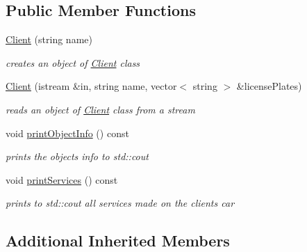 \subsection*{Public Member Functions}
\begin{DoxyCompactItemize}
\item 
\hypertarget{class_client_a62ec00483394e1de13111094b221921d}{}\hyperlink{class_client_a62ec00483394e1de13111094b221921d}{Client} (string name)\label{class_client_a62ec00483394e1de13111094b221921d}

\begin{DoxyCompactList}\small\item\em creates an object of \hyperlink{class_client}{Client} class \end{DoxyCompactList}\item 
\hyperlink{class_client_aae5506d2aa6e4486f8e393b75ff5b5f4}{Client} (istream \&in, string name, vector$<$ string $>$ \&license\+Plates)
\begin{DoxyCompactList}\small\item\em reads an object of \hyperlink{class_client}{Client} class from a stream \end{DoxyCompactList}\item 
\hypertarget{class_client_a774e8af1c055d52dfe8a1db0847332d0}{}void \hyperlink{class_client_a774e8af1c055d52dfe8a1db0847332d0}{print\+Object\+Info} () const \label{class_client_a774e8af1c055d52dfe8a1db0847332d0}

\begin{DoxyCompactList}\small\item\em prints the objects\textquotesingle{} info to std\+::cout \end{DoxyCompactList}\item 
\hypertarget{class_client_aef483ed374ceca699aa17bc90fe82f68}{}void \hyperlink{class_client_aef483ed374ceca699aa17bc90fe82f68}{print\+Services} () const \label{class_client_aef483ed374ceca699aa17bc90fe82f68}

\begin{DoxyCompactList}\small\item\em prints to std\+::cout all services made on the client\textquotesingle{}s car \end{DoxyCompactList}\end{DoxyCompactItemize}
\subsection*{Additional Inherited Members}


